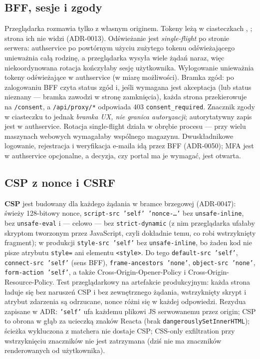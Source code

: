 \subsection{BFF, sesje i zgody}

Przeglądarka rozmawia tylko z własnym originem. Tokeny leżą w ciasteczkach
, ; strona ich nie widzi (ADR-0013).
Odświeżanie jest \emph{single-flight} po stronie serwera: authservice po
powtórnym użyciu zużytego tokenu odświeżającego unieważnia całą rodzinę, a
przeglądarka wysyła wiele żądań naraz, więc niekoordynowana rotacja kończyłaby
sesję użytkownika. Wylogowanie unieważnia tokeny odświeżające w authservice
(w miarę możliwości). Bramka zgód: po zalogowaniu BFF czyta status zgód i,
jeśli wymagana jest akceptacja (lub status nieznany --- bramka zawodzi w stronę
zamknięcia), każda strona przekierowuje na \texttt{/consent}, a \texttt{/api/proxy/*}
odpowiada 403 \texttt{consent\_required}. Znacznik zgody w ciasteczku to jednak
\emph{bramka UX, nie granica autoryzacji}; autorytatywny zapis jest w authservice.
Rotacja single-flight działa w obrębie procesu --- przy wielu maszynach webowych
wymagałaby wspólnego magazynu. Dwuskładnikowe logowanie, rejestracja i weryfikacja
e-maila idą przez BFF (ADR-0050); MFA jest w authservice opcjonalne, a decyzja, czy
portal ma je wymagać, jest otwarta.

\subsection{CSP z nonce i CSRF}

\textbf{CSP} jest budowany dla każdego żądania w bramce brzegowej (ADR-0047): świeży
128-bitowy nonce, \texttt{script-src 'self' 'nonce-\ldots'} bez
\texttt{unsafe-inline}, bez \texttt{unsafe-eval} i --- celowo --- bez
\texttt{strict-dynamic} (z nim przeglądarka ufałaby skryptom tworzonym przez
JavaScript, czyli dokładnie temu, co robi wstrzyknięty fragment); w produkcji
\texttt{style-src 'self'} bez \texttt{unsafe-inline}, bo żaden kod nie pisze
atrybutu \texttt{style=} ani elementu \texttt{<style>}. Do tego
\texttt{default-src 'self'}, \texttt{connect-src 'self'} (sens BFF),
\texttt{frame-ancestors 'none'}, \texttt{object-src 'none'}, \texttt{form-action 'self'}, a
także Cross-Origin-Opener-Policy i Cross-Origin-Resource-Policy. Test
przeglądarkowy na artefakcie produkcyjnym: każda strona ładuje się bez naruszeń CSP i
bez zewnętrznego żądania, wstrzyknięty skrypt i atrybut zdarzenia są odrzucane, nonce
różni się w każdej odpowiedzi. Rezydua zapisane w ADR: \texttt{'self'} ufa każdemu
plikowi JS serwowanemu przez origin; CSP to obrona w głąb za ucieczką znaków
Reacta (brak \texttt{dangerouslySetInnerHTML}); ścieżka wykluczona z matchera nie
dostaje CSP; CSS-only exfiltration przy wstrzyknięciu znaczników nie jest zatrzymana
(dziś nie ma znaczników renderowanych od użytkownika).

